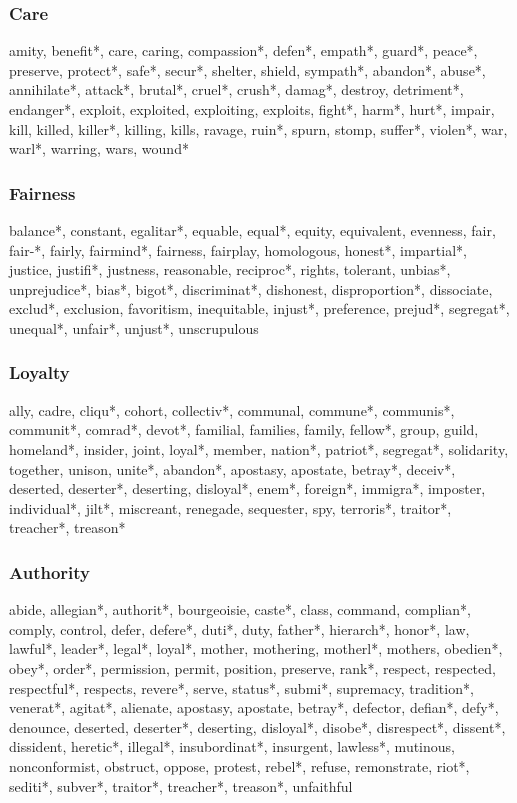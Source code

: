 \subsubsection*{Care} amity, benefit*, care, caring, compassion*, defen*, empath*, guard*, peace*, preserve, protect*, safe*, secur*, shelter, shield, sympath*, abandon*, abuse*, annihilate*, attack*, brutal*, cruel*, crush*, damag*, destroy, detriment*, endanger*, exploit, exploited, exploiting, exploits, fight*, harm*, hurt*, impair, kill, killed, killer*, killing, kills, ravage, ruin*, spurn, stomp, suffer*, violen*, war, warl*, warring, wars, wound* 

\subsubsection*{Fairness} balance*, constant, egalitar*, equable, equal*, equity, equivalent, evenness, fair, fair-*, fairly, fairmind*, fairness, fairplay, homologous, honest*, impartial*, justice, justifi*, justness, reasonable, reciproc*, rights, tolerant, unbias*, unprejudice*, bias*, bigot*, discriminat*, dishonest, disproportion*, dissociate, exclud*, exclusion, favoritism, inequitable, injust*, preference, prejud*, segregat*, unequal*, unfair*, unjust*, unscrupulous

\subsubsection*{Loyalty} ally, cadre, cliqu*, cohort, collectiv*, communal, commune*, communis*, communit*, comrad*, devot*, familial, families, family, fellow*, group, guild, homeland*, insider, joint, loyal*, member, nation*, patriot*, segregat*, solidarity, together, unison, unite*, abandon*, apostasy, apostate, betray*, deceiv*, deserted, deserter*, deserting, disloyal*, enem*, foreign*, immigra*, imposter, individual*, jilt*, miscreant, renegade, sequester, spy, terroris*, traitor*, treacher*, treason* 

\subsubsection*{Authority} abide, allegian*, authorit*, bourgeoisie, caste*, class, command, complian*, comply, control, defer, defere*, duti*, duty, father*, hierarch*, honor*, law, lawful*, leader*, legal*, loyal*, mother, mothering, motherl*, mothers, obedien*, obey*, order*, permission, permit, position, preserve, rank*, respect, respected, respectful*, respects, revere*, serve, status*, submi*, supremacy, tradition*, venerat*, agitat*, alienate, apostasy, apostate, betray*, defector, defian*, defy*, denounce, deserted, deserter*, deserting, disloyal*, disobe*, disrespect*, dissent*, dissident, heretic*, illegal*, insubordinat*, insurgent, lawless*, mutinous, nonconformist, obstruct, oppose, protest, rebel*, refuse, remonstrate, riot*, sediti*, subver*, traitor*, treacher*, treason*, unfaithful


